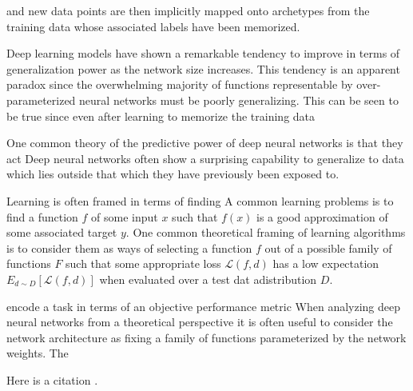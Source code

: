\documentclass[twoside,11pt]{article}
\begin{document}
and new data points are then implicitly mapped onto archetypes from the training data whose associated labels have been memorized. 

Deep learning models have shown a remarkable tendency to improve in terms of generalization power as the network size increases. This tendency is an apparent paradox since the overwhelming majority of functions representable by over-parameterized neural networks must be poorly generalizing. This can be seen to be true since even after learning to memorize the training data 


One common theory of the predictive power of deep neural networks is that they act 
Deep neural networks often show a surprising capability to generalize to data which lies outside that which they have previously been exposed to. 

Learning is often framed in terms of finding 
A common learning problems is to find a function $f$ of some input $x$ such that $f(x)$ is a good approximation of some associated target $y$.     
One common theoretical framing of learning algorithms is to consider them as ways of selecting a function $f$ out of a possible family of functions $F$ such that some appropriate loss $\mathcal{L}(f, d)$ has a low expectation $E_{d \sim D}[\mathcal{L}(f, d)]$ when evaluated over a test dat adistribution $D$. 

encode a task in terms of an objective performance metric
When analyzing deep neural networks from a theoretical perspective it is often useful to consider the network architecture as fixing a family of functions parameterized by the network weights. The 

Here is a citation \cite{chow:68}.





\end{document}
